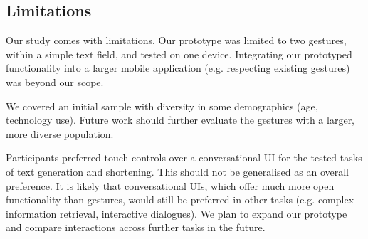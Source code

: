 \subsection{Limitations}
Our study comes with limitations.
Our prototype was limited to two gestures, within a simple text field, and tested on one device. 
Integrating our prototyped functionality into a larger mobile application (e.g. respecting existing gestures) was beyond our scope.

We covered an initial sample with diversity in some demographics (age, technology use). 
Future work should further evaluate the gestures with a larger, more diverse population.

Participants preferred touch controls over a conversational UI for the tested tasks of text generation and shortening. 
This should not be generalised as an overall preference. 
It is likely that conversational UIs, which offer much more open functionality than gestures, would still be preferred in other tasks (e.g. complex information retrieval, interactive dialogues).
We plan to expand our prototype and compare interactions across further tasks in the future.


